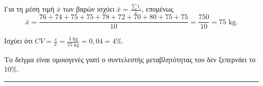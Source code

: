 \begin{alist}
    \item  Για τη μέση τιμή $\bar{x}$ των βαρών ισχύει $\bar{x} = \frac{\sum t_i}{\nu}$, επομένως
    \[
        \bar{x} = \frac{76+74+75+75+78+72+70+80+75+75}{10} = \frac{750}{10} = 75 \text{ kg.}
    \]
    \item  Ισχύει ότι $CV = \frac{s}{\bar{x}} = \frac{3 \text{ kg}}{75 \text{ kg}} = 0,04 = 4\%$.
    \item  Το δείγμα είναι ομοιογενές γιατί ο συντελεστής μεταβλητότητας του δεν ξεπερνάει το 10\%.
\end{alist}
\vspace{6mm}
\noindent\rule{\textwidth}{0.4pt}
\vspace{6mm}

